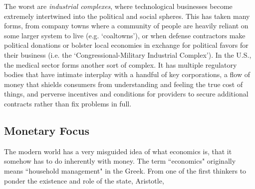 \documentclass[letterpaper]{article}
\begin{document}
The worst are \textit{industrial complexes}, where technological businesses become extremely intertwined into the political and social spheres. This has taken many forms, from company towns where a community of people are heavily reliant on some larger system to live (e.g. `coaltowns'), or when defense contractors make political donations or bolster local economies in exchange for political favors for their business (i.e. the `Congressional-Military Industrial Complex'). In the U.S., the medical sector forms another sort of complex. It has multiple regulatory bodies that have intimate interplay with a handful of key corporations, a flow of money that shields consumers from understanding and feeling the true cost of things, and perverse incentives and conditions for providers to secure additional contracts rather than fix problems in full.




\subsection{Monetary Focus}

The modern world has a very misguided idea of what economics is, that it somehow has to do inherently with money. The term ``economics" originally means ``household management" in the Greek. From one of the first thinkers to ponder the existence and role of the state, Aristotle,
\end{document}
